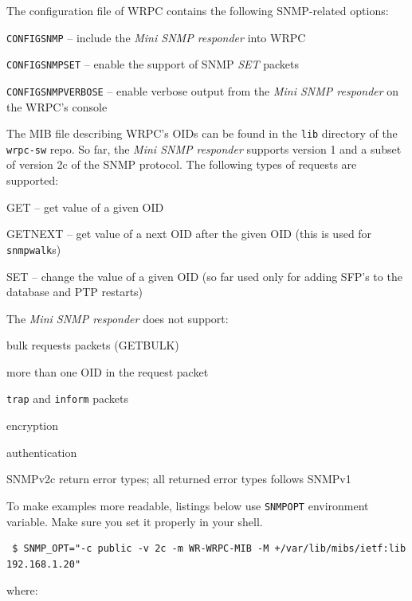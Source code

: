 \documentclass[a4paper, 12pt]{article}
\renewcommand{\_}{\underscore\allowbreak}
\begin{document}
The configuration file of WRPC contains the following
SNMP-related options:
\begin{itemize*}
\item \texttt{CONFIG\_SNMP} -- include the \textit{Mini SNMP responder} into WRPC
\item \texttt{CONFIG\_SNMP\_SET} -- enable the support of SNMP \textit{SET} packets
\item \texttt{CONFIG\_SNMP\_VERBOSE} -- enable verbose output from the \textit{Mini SNMP
      responder} on the WRPC's console
\end{itemize*}

The MIB file describing WRPC's OIDs can be found in the \texttt{lib} directory
of the \texttt{wrpc-sw} repo.
So far, the \textit{Mini SNMP responder} supports version 1 and a subset of version
2c of the SNMP protocol.
The following types of requests are supported:
\begin{itemize*}
   \item GET -- get value of a given OID
   \item GETNEXT -- get value of a next OID after the given OID (this is used
         for \texttt{snmpwalk}s)
   \item SET -- change the value of a given OID (so far used only for adding
         SFP's to the database and PTP restarts)
\end{itemize*}
The \textit{Mini SNMP responder} does not support:
\begin{itemize*}
   \item bulk requests packets (GETBULK)
   \item more than one OID in the request packet
   \item \texttt{trap} and \texttt{inform} packets
   \item encryption
   \item authentication
   \item SNMPv2c return error types; all returned error types follows SNMPv1
\end{itemize*}
To make examples more readable, listings below use \texttt{SNMP\_OPT} environment
variable. Make sure you set it properly in your shell.
\begin{lstlisting}
 $ SNMP_OPT="-c public -v 2c -m WR-WRPC-MIB -M +/var/lib/mibs/ietf:lib 192.168.1.20"
\end{lstlisting}
where:
\end{document}
